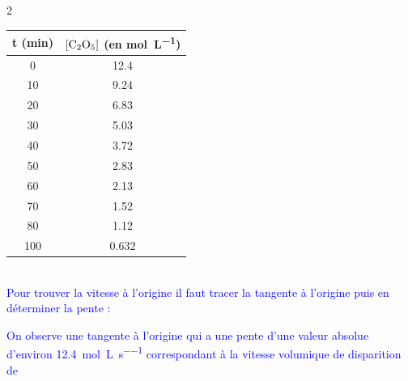 \documentclass[a4paper,11pt,fleqn]{article}%
\begin{document}
\begin{multicols}{2}
\begin{tabular}{|c|c|} \hline
    t (min) & $[\ce{C2O5}]$ (en \unit{\mole\per\liter})\\
    \hline
    0 & 12.4\\
    10 & 9.24\\
    20 & 6.83\\
    30 & 5.03\\
    40 & 3.72\\
    50 & 2.83\\
    60 & 2.13\\
    70 & 1.52\\
    80 & 1.12\\
    100 & 0.632\\
    \hline
\end{tabular}\\
\textcolor{blue}{Pour trouver la vitesse à l'origine il faut tracer la tangente à l'origine puis en déterminer la pente :}
\begin{center}
\end{center}

\textcolor{blue}{On observe une tangente à l'origine qui a une pente d'une valeur absolue d'environ \SI{12,4}{\mole\per\liter\per\second} correspondant à la vitesse volumique de disparition de }


\end{multicols}
\end{document}
